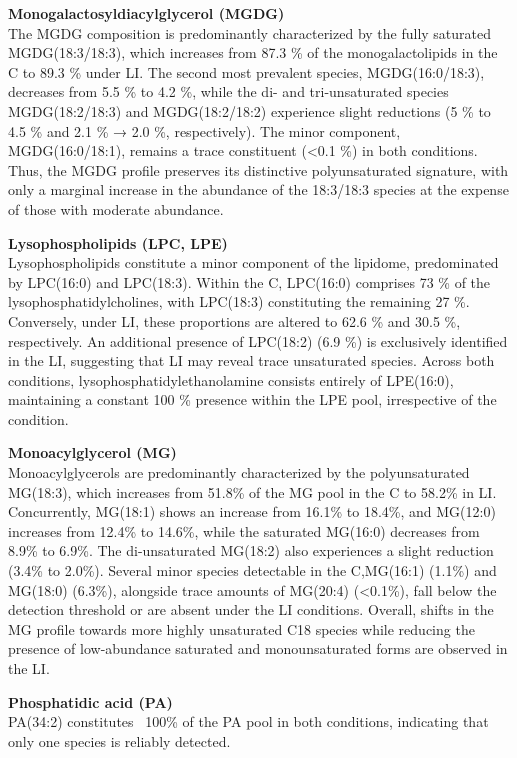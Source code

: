 \documentclass[10pt,letterpaper]{article}
\begin{document}
\textbf{Monogalactosyldiacylglycerol (MGDG)} \\
The MGDG composition is predominantly characterized by the fully saturated MGDG(18:3/18:3), which increases from 87.3 \% of the monogalactolipids in the C to 89.3 \% under LI. The second most prevalent species, MGDG(16:0/18:3), decreases from 5.5 \% to 4.2 \%, while the di- and tri-unsaturated species MGDG(18:2/18:3) and MGDG(18:2/18:2) experience slight reductions (5 \% to 4.5 \% and 2.1 \% → 2.0 \%, respectively). The minor component, MGDG(16:0/18:1), remains a trace constituent (<0.1 \%) in both conditions. Thus, the MGDG profile preserves its distinctive polyunsaturated signature, with only a marginal increase in the abundance of the 18:3/18:3 species at the expense of those with moderate abundance.

\textbf{Lysophospholipids (LPC, LPE)} \\
Lysophospholipids constitute a minor component of the lipidome, predominated by LPC(16:0) and LPC(18:3). Within the C, LPC(16:0) comprises 73 \% of the lysophosphatidylcholines, with LPC(18:3) constituting the remaining 27 \%. Conversely, under LI, these proportions are altered to 62.6 \% and 30.5 \%, respectively. An additional presence of LPC(18:2) (6.9 \%) is exclusively identified in the LI, suggesting that LI may reveal trace unsaturated species. Across both conditions, lysophosphatidylethanolamine consists entirely of LPE(16:0), maintaining a constant 100 \% presence within the LPE pool, irrespective of the condition.

\textbf{Monoacylglycerol (MG)}  \\
Monoacylglycerols are predominantly characterized by the polyunsaturated MG(18:3), which increases from 51.8\% of the MG pool in the C to 58.2\% in LI. Concurrently, MG(18:1) shows an increase from 16.1\% to 18.4\%, and MG(12:0) increases from 12.4\% to 14.6\%, while the saturated MG(16:0) decreases from 8.9\% to 6.9\%. The di-unsaturated MG(18:2) also experiences a slight reduction (3.4\% to 2.0\%). Several minor species detectable in the C,MG(16:1) (1.1\%) and MG(18:0) (6.3\%), alongside trace amounts of MG(20:4) (\textless0.1\%), fall below the detection threshold or are absent under the LI conditions. Overall, shifts in the MG profile towards more highly unsaturated C18 species while reducing the presence of low-abundance saturated and monounsaturated forms are observed in the LI.

\textbf{Phosphatidic acid (PA)}  \\
PA(34:2) constitutes ~100\% of the PA pool in both conditions, indicating that only one species is reliably detected.
\end{document}
